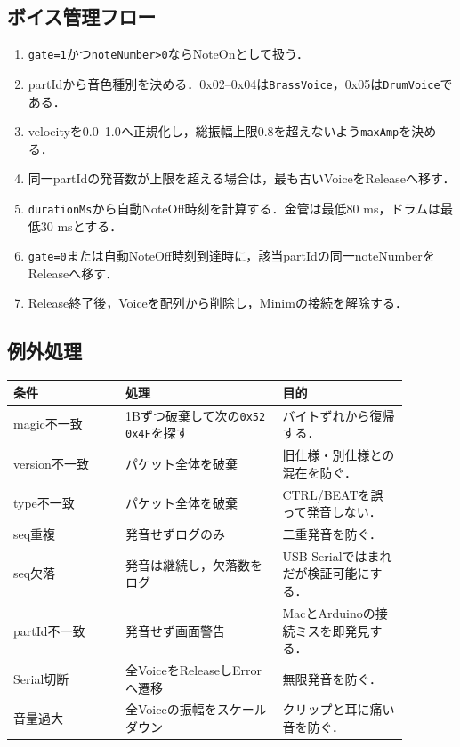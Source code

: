 \documentclass[a4paper,11pt]{jsarticle}
\begin{document}
\subsection{ボイス管理フロー}

\begin{enumerate}
\item \texttt{gate=1}かつ\texttt{noteNumber>0}ならNoteOnとして扱う．
\item partIdから音色種別を決める．0x02--0x04は\texttt{BrassVoice}，0x05は\texttt{DrumVoice}である．
\item velocityを0.0--1.0へ正規化し，総振幅上限0.8を超えないよう\texttt{maxAmp}を決める．
\item 同一partIdの発音数が上限を超える場合は，最も古いVoiceをReleaseへ移す．
\item \texttt{durationMs}から自動NoteOff時刻を計算する．金管は最低80 ms，ドラムは最低30 msとする．
\item \texttt{gate=0}または自動NoteOff時刻到達時に，該当partIdの同一noteNumberをReleaseへ移す．
\item Release終了後，Voiceを配列から削除し，Minimの接続を解除する．
\end{enumerate}

\subsection{例外処理}

\begin{longtable}{p{0.25\linewidth}p{0.35\linewidth}p{0.28\linewidth}}
\toprule
条件 & 処理 & 目的 \\
\midrule
\endhead
magic不一致 & 1Bずつ破棄して次の\texttt{0x52 0x4F}を探す & バイトずれから復帰する． \\
version不一致 & パケット全体を破棄 & 旧仕様・別仕様との混在を防ぐ． \\
type不一致 & パケット全体を破棄 & CTRL/BEATを誤って発音しない． \\
seq重複 & 発音せずログのみ & 二重発音を防ぐ． \\
seq欠落 & 発音は継続し，欠落数をログ & USB Serialではまれだが検証可能にする． \\
partId不一致 & 発音せず画面警告 & MacとArduinoの接続ミスを即発見する． \\
Serial切断 & 全VoiceをReleaseしErrorへ遷移 & 無限発音を防ぐ． \\
音量過大 & 全Voiceの振幅をスケールダウン & クリップと耳に痛い音を防ぐ． \\
\bottomrule
\end{longtable}
\end{document}
